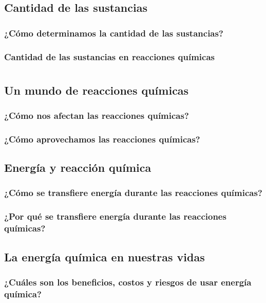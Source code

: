 \documentclass[11pt]{book}
\begin{document}
\newpage
\section{Cantidad de las sustancias}
\subsection{¿Cómo determinamos la cantidad de las sustancias?}
\subsection{Cantidad de las sustancias en reacciones químicas}


\chapter{}

\newpage
\section{Un mundo de reacciones químicas}
\subsection{¿Cómo nos afectan las reacciones químicas?}
\subsection{¿Cómo aprovechamos las reacciones químicas?}

\newpage
\section{Energía y reacción química}
\subsection{¿Cómo se transfiere energía durante las reacciones químicas?}
\subsection{¿Por qué se transfiere energía durante las reacciones químicas?}

\newpage
\section{La energía química en nuestras vidas}
\subsection{¿Cuáles son los beneficios, costos y riesgos de usar energía química?}
\end{document}

